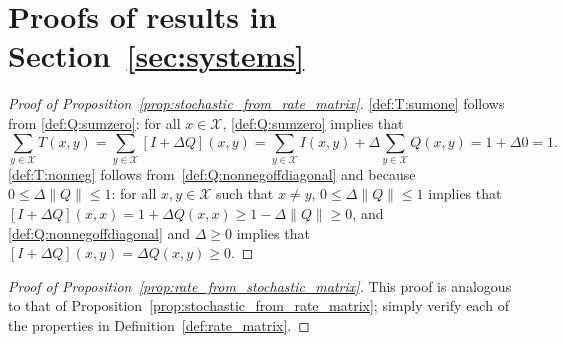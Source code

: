 \documentclass[10pt,a4paper]{paper}
\theoremstyle{definition}
\newcommand{\states}{\mathcal{X}}
\newcommand{\norm}[1]{\left\lVert #1 \right\rVert}
\begin{document}
 


\appendix


\section{Proofs of results in Section~\ref{sec:systems}}\label{app:systems}


\begin{proof}[Proof of Proposition~\ref{prop:stochastic_from_rate_matrix}]
\ref{def:T:sumone} follows from \ref{def:Q:sumzero}: for all $x\in\states$, \ref{def:Q:sumzero} implies that
\begin{equation*}
\sum_{y\in\states} T(x,y) = \sum_{y\in\states} [I + \Delta Q](x,y) = \sum_{y\in\states}I(x,y) + \Delta \sum_{y\in\states}Q(x,y) = 1+\Delta 0=1.
\end{equation*}
\ref{def:T:nonneg} follows from~\ref{def:Q:nonnegoffdiagonal} and because $0\leq \Delta\norm{Q} \leq 1$: for all $x,y\in\states$ such that $x\neq y$, $0\leq\Delta\norm{Q} \leq 1$ implies that $[I+\Delta Q](x,x)=1+\Delta Q(x,x)\geq 1-\Delta\norm{Q}\geq0$, and \ref{def:Q:nonnegoffdiagonal} and $\Delta\geq0$ implies that $[I+\Delta Q](x,y)=\Delta Q(x,y)\geq0$.
\end{proof}

\begin{proof}[Proof of Proposition~\ref{prop:rate_from_stochastic_matrix}]
This proof is analogous to that of Proposition~\ref{prop:stochastic_from_rate_matrix}; simply verify each of the properties in Definition~\ref{def:rate_matrix}.
\end{proof}
\end{document}
